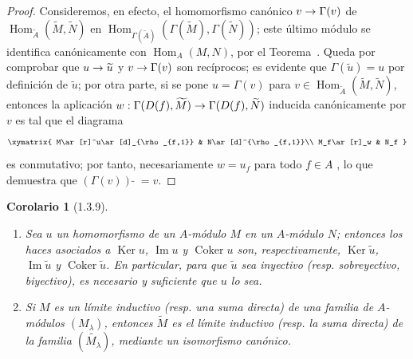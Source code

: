 \documentclass[oneside]{amsart}
\theoremstyle{ega-env-style}
\theoremstyle{ega-thm-env-style}
\newtheorem*{corollary}{Corolario}
\theoremstyle{ega-defn-env-style}
\def\supertilde{{\,\widetilde{\,}\,}}   %
\renewcommand{\to}{\mathchoice{\longrightarrow}{\rightarrow}{\rightarrow}{\rightarrow}}
\let\EGAOriginalLabel\label
\renewcommand{\label}[1]{\phantomsection\EGAOriginalLabel{#1}}
\begin{document}
\begin{proof}
Consideremos, en efecto, el homomorfismo canónico $v\to\Gamma(v)$ de $\operatorname{Hom}_{\widetilde{A}}(\widetilde{M},\widetilde{N})$ en $\operatorname{Hom}_{\Gamma(\widetilde{A})}
(\Gamma(\widetilde{M}),\Gamma(\widetilde{N}))$;
este último módulo se identifica canónicamente con $\operatorname{Hom}_A(M,N)$, por el Teorema~.
Queda por comprobar que $u\to\widetilde{u}$ y $v\to\Gamma(v)$ son recíprocos;
es evidente que $\Gamma(\widetilde{u})=u$ por definición de $\widetilde{u}$;
por otra parte, si se pone $u=\Gamma(v)$ para $v\in\operatorname{Hom}_{\widetilde{A}}(\widetilde{M},\widetilde{N})$, entonces la aplicación $w:\Gamma(D(f),\widetilde{M})\to\Gamma(D(f),\widetilde{N})$ inducida canónicamente por $v$ es tal que el diagrama
\[
  \xymatrix{
    M\ar[r]^u\ar[d]_{\rho_{f,1}} & N\ar[d]^{\rho_{f,1}}\\
    M_f\ar[r]_w & N_f
  }
\]
es conmutativo;
por tanto, necesariamente $w=u_f$ para todo $f\in A$ , lo que demuestra que $(\Gamma(v))\supertilde=v$.
\end{proof}

\begin{corollary}[1.3.9]
\label{I.1.3.9}
\medskip\noindent
\begin{enumerate}
  \item[{\rm(i)}] Sea $u$ un homomorfismo de un $A$-módulo $M$ en un $A$-módulo $N$;
    entonces los haces asociados a $\operatorname{Ker}u$, $\operatorname{Im}u$ y $\operatorname{Coker}u$ son, respectivamente, $\operatorname{Ker}\widetilde{u}$, $\operatorname{Im}\widetilde{u}$ y $\operatorname{Coker}\widetilde{u}$.
    En particular, para que $\widetilde{u}$ sea inyectivo \textup{(resp. \emph{sobreyectivo, biyectivo})}, es necesario y suficiente que $u$ lo sea.
  \item[{\rm(ii)}] Si $M$ es un límite inductivo \textup{(resp. una \emph{suma directa})} de una familia de $A$-módulos $(M_\lambda)$, entonces $\widetilde{M}$ es el límite inductivo \textup{(resp. la \emph{suma directa})} de la familia $(\widetilde{M_\lambda})$, mediante un isomorfismo canónico.
\end{enumerate}
\end{corollary}
\end{document}
